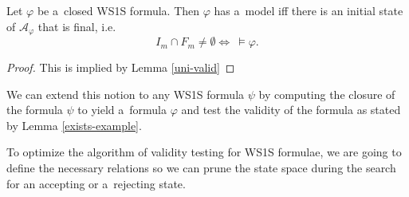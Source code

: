 \begin{lemma}\label{exists-example}
Let $\varphi$ be a~closed WS1S formula. Then $\varphi$ has a~model
iff there is an initial state of $\mathcal{A}_\varphi$ that is final, i.e.
\begin{equation}
 I_m \cap F_m \neq \emptyset \Leftrightarrow\ \models \varphi.
\end{equation}
\end{lemma}

\begin{proof}
This is implied by Lemma \ref{uni-valid}
\end{proof}

We can extend this notion to any WS1S formula $\psi$ by computing the
closure of the formula $\psi$ to yield a~formula $\varphi$ and test the validity
of the formula as stated by Lemma \ref{exists-example}.

% 
% 

To optimize the algorithm of validity testing for WS1S formulae, we are going
to define the necessary relations so we can prune the state space during the
search for an accepting or a~rejecting state. 

